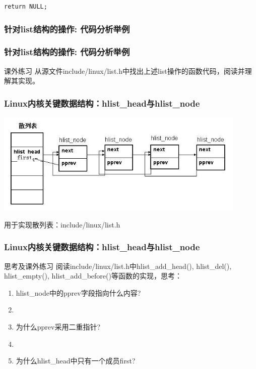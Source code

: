 \documentclass[xcolor=svgnames]{beamer}
\begin{document}
\begin{CJK*}{UTF8}{gbsn}
{\begin{lstlisting}[tabsize=8,basicstyle=\ttfamily]
return NULL;
\end{lstlisting}
}
\begin{frame}[fragile]
\frametitle{针对list结构的操作: 代码分析举例}
\lstforeach
\end{frame}

\begin{frame}[fragile]
\frametitle{针对list结构的操作: 代码分析举例}
\begin{block}{课外练习}
从源文件include/linux/list.h中找出上述list操作的函数代码，阅读并理解其实现。
\end{block}
\end{frame}

\begin{frame}[fragile]
\frametitle{Linux内核关键数据结构：hlist\_head与hlist\_node}
\includegraphics[width=0.9\textwidth]{hlist.jpeg}
\begin{block}{用于实现散列表：include/linux/list.h}
\lsthlist
\end{block}
\end{frame}

\begin{frame}%
\frametitle{Linux内核关键数据结构：hlist\_head与hlist\_node}
\begin{block}{思考及课外练习}
阅读include/linux/list.h中\alert{hlist\_add\_head}(), \alert{hlist\_del}(), \alert{hlist\_empty}(),
\alert{hlist\_add\_before}()等函数的实现，思考：

\begin{enumerate}
\item hlist\_node中的pprev字段指向什么内容?
\item[]
\item 为什么pprev采用二重指针?
\item[]
\item 为什么hlist\_head中只有一个成员first?
\end{enumerate}
\end{block}
\end{frame}


\end{CJK*}
\end{document}
